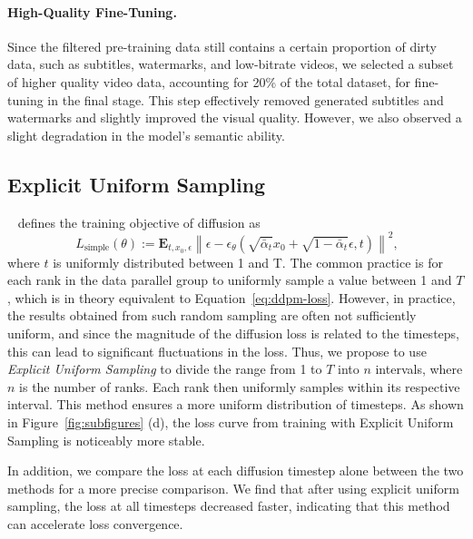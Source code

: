 \paragraph{High-Quality Fine-Tuning.}
Since the filtered pre-training data still contains a certain proportion of dirty data, such as subtitles, watermarks, and low-bitrate videos, we selected a subset of higher quality video data, accounting for 20\% of the total dataset, for fine-tuning in the final stage. This step effectively removed generated subtitles and watermarks and slightly improved the visual quality. However, we also observed a slight degradation in the model's semantic ability.


\subsection{Explicit Uniform Sampling}

~\citet{ho2020denoising} defines the training objective of diffusion as 
\begin{equation}~\label{eq:ddpm-loss}
    L_\mathrm{simple}(\theta) := \mathbf{E}_{t, x_0, \epsilon}{ \left\| \epsilon - \epsilon_\theta(\sqrt{\bar\alpha_t} x_0 + \sqrt{1-\bar\alpha_t}\epsilon, t) \right\|^2},
\end{equation}
where $t$ is uniformly distributed between 1 and T. 
The common practice is for each rank in the data parallel group to uniformly sample a value between 1 and $T$, which is in theory equivalent to Equation~\ref{eq:ddpm-loss}. 
However, in practice, the results obtained from such random sampling are often not sufficiently uniform, and since the magnitude of the diffusion loss is related to the timesteps, this can lead to significant fluctuations in the loss. 
Thus, we propose to use \textit{Explicit Uniform Sampling} to divide the range from 1 to $T$ into $n$ intervals, where $n$ is the number of ranks. 
Each rank then uniformly samples within its respective interval. 
This method ensures a more uniform distribution of timesteps. 
As shown in Figure~\ref{fig:subfigures} (d), the loss curve from training with Explicit Uniform Sampling is noticeably more stable. 

In addition, we compare the loss at each diffusion timestep alone between the two methods for a more precise comparison. We find that after using explicit uniform sampling, the loss at all timesteps decreased faster, indicating that this method can accelerate loss convergence.